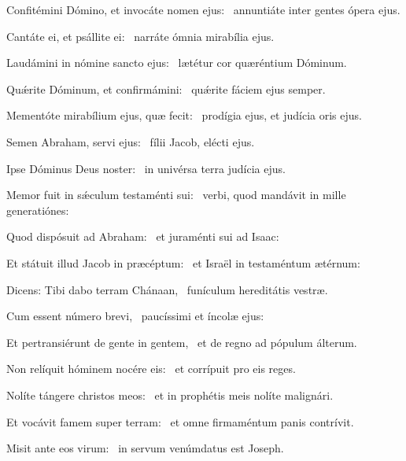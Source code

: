 \item Confitémini Dómino, et invocáte nomen ejus:~\psstar{} annuntiáte inter gentes ópera ejus.

\item Cantáte ei, et psállite ei:~\psstar{} narráte ómnia mirabília ejus.

\item Laudámini in nómine sancto ejus:~\psstar{} lætétur cor quæréntium Dóminum.

\item Quǽrite Dóminum, et confirmámini:~\psstar{} quǽrite fáciem ejus semper.

\item Mementóte mirabílium ejus, quæ fecit:~\psstar{} prodígia ejus, et judícia oris ejus.

\item Semen Abraham, servi ejus:~\psstar{} fílii Jacob, elécti ejus.

\item Ipse Dóminus Deus noster:~\psstar{} in univérsa terra judícia ejus.

\item Memor fuit in sǽculum testaménti sui:~\psstar{} verbi, quod mandávit in mille generatiónes:

\item Quod dispósuit ad Abraham:~\psstar{} et juraménti sui ad Isaac:

\item Et státuit illud Jacob in præcéptum:~\psstar{} et Israël in testaméntum ætérnum:

\item Dicens: Tibi dabo terram Chánaan,~\psstar{} funículum hereditátis vestræ.

\item Cum essent número brevi,~\psstar{} paucíssimi et íncolæ ejus:

\item Et pertransiérunt de gente in gentem,~\psstar{} et de regno ad pópulum álterum.

\item Non relíquit hóminem nocére eis:~\psstar{} et corrípuit pro eis reges.

\item Nolíte tángere christos meos:~\psstar{} et in prophétis meis nolíte malignári.

\item Et vocávit famem super terram:~\psstar{} et omne firmaméntum panis contrívit.

\item Misit ante eos virum:~\psstar{} in servum venúmdatus est Joseph.

